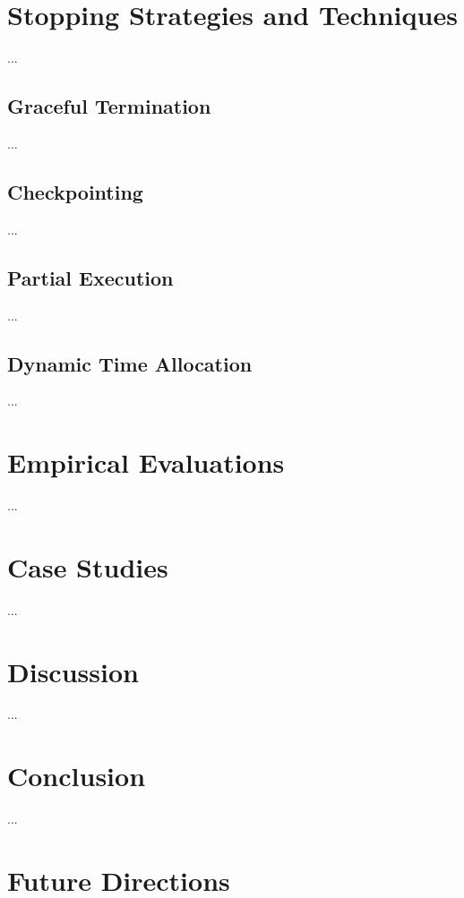 \documentclass{article}
\begin{document}
\section{Stopping Strategies and Techniques}

...

\subsection{Graceful Termination}

...

\subsection{Checkpointing}

...

\subsection{Partial Execution}

...

\subsection{Dynamic Time Allocation}

...

\section{Empirical Evaluations}

...

\section{Case Studies}

...

\section{Discussion}

...

\section{Conclusion}

...

\section{Future Directions}
\end{document}

